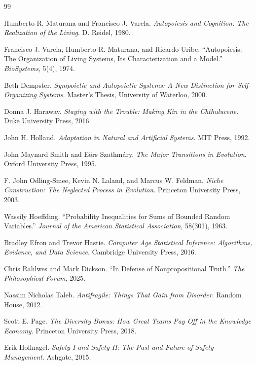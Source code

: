 \documentclass[11pt,a4paper]{article}
\theoremstyle{plain}
\theoremstyle{definition}
\theoremstyle{remark}
\begin{document}
\begin{thebibliography}{99}

Humberto R. Maturana and Francisco J. Varela.
\textit{Autopoiesis and Cognition: The Realization of the Living}.
D. Reidel, 1980.

Francisco J. Varela, Humberto R. Maturana, and Ricardo Uribe.
``Autopoiesis: The Organization of Living Systems, Its Characterization and a Model.''
\textit{BioSystems}, 5(4), 1974.

Beth Dempster.
\textit{Sympoietic and Autopoietic Systems: A New Distinction for Self-Organizing Systems}.
Master's Thesis, University of Waterloo, 2000.

Donna J. Haraway.
\textit{Staying with the Trouble: Making Kin in the Chthulucene}.
Duke University Press, 2016.

John H. Holland.
\textit{Adaptation in Natural and Artificial Systems}.
MIT Press, 1992.

John Maynard Smith and E\"ors Szathm\'ary.
\textit{The Major Transitions in Evolution}.
Oxford University Press, 1995.

F. John Odling-Smee, Kevin N. Laland, and Marcus W. Feldman.
\textit{Niche Construction: The Neglected Process in Evolution}.
Princeton University Press, 2003.

Wassily Hoeffding.
``Probability Inequalities for Sums of Bounded Random Variables.''
\textit{Journal of the American Statistical Association}, 58(301), 1963.

Bradley Efron and Trevor Hastie.
\textit{Computer Age Statistical Inference: Algorithms, Evidence, and Data Science}.
Cambridge University Press, 2016.

Chris Rahlwes and Mark Dickson.
``In Defense of Nonpropositional Truth.''
\textit{The Philosophical Forum}, 2025.

Nassim Nicholas Taleb.
\textit{Antifragile: Things That Gain from Disorder}.
Random House, 2012.

Scott E. Page.
\textit{The Diversity Bonus: How Great Teams Pay Off in the Knowledge Economy}.
Princeton University Press, 2018.

Erik Hollnagel.
\textit{Safety-I and Safety-II: The Past and Future of Safety Management}.
Ashgate, 2015.


\end{thebibliography}
\end{document}
